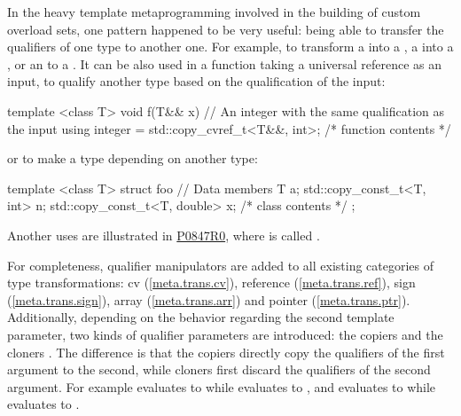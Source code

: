 \documentclass[ebook,10pt,oneside,openany,final]{memoir}
\begin{document}
In the heavy template metaprogramming involved in the building of custom overload sets, one pattern happened to be very useful: being able to transfer the qualifiers of one type to another one. For example, to transform a  into a , a  into a , or an  to a . It can be also used in a function taking a universal reference as an input, to qualify another type based on the qualification of the input:
\begin{codeblock}
template <class T> void f(T&& x) {
    // An integer with the same qualification as the input
    using integer = std::copy_cvref_t<T&&, int>;
    /* function contents */
}
\end{codeblock}
or to make a type  depending on another type:
\begin{codeblock}
template <class T> struct foo {
    // Data members
    T a;
    std::copy_const_t<T, int> n;
    std::copy_const_t<T, double> x;
    /* class contents */
};
\end{codeblock}
Another uses are illustrated in \href{http://www.open-std.org/jtc1/sc22/wg21/docs/papers/2018/p0847r0.html}{P0847R0}, where  is called .

For completeness, qualifier manipulators are added to all existing categories of type transformations: cv (\ref{meta.trans.cv}), reference (\ref{meta.trans.ref}), sign (\ref{meta.trans.sign}), array (\ref{meta.trans.arr}) and pointer (\ref{meta.trans.ptr}). Additionally, depending on the behavior regarding the second template parameter, two kinds of qualifier parameters are introduced: the copiers  and the cloners . The difference is that the copiers directly copy the qualifiers of the first argument to the second, while cloners first discard the qualifiers of the second argument. For example  evaluates to  while  evaluates to , and  evaluates to  while  evaluates to .
\end{document}
